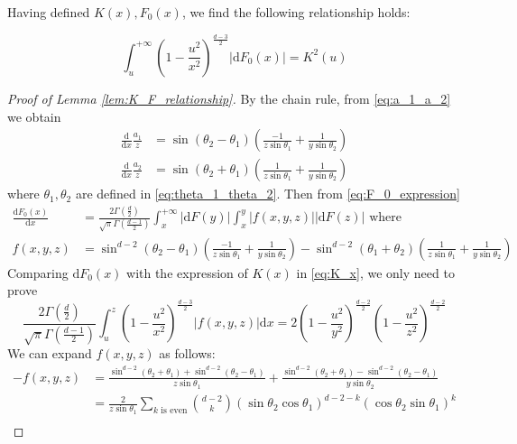 \documentclass{aptpub}
\def\d{\mathrm{d}}
\begin{document}
Having defined $K(x), F_0(x)$, we find the following relationship holds:
\begin{lemma}\label{lem:K_F_relationship}
\begin{equation}\label{eq:F_0_integration}
     \int_u^{+\infty}
     (1-\frac{u^2}{x^2})^{\frac{d-3}{2}} |\d F_0(x)| = K^2(u)
\end{equation}
\end{lemma}
\begin{proof}[Proof of Lemma \ref{lem:K_F_relationship}]
     By the chain rule, from \eqref{eq:a_1_a_2} we obtain
\begin{align*}
    \frac{\d}{\d x}\frac{a_1}{z} &
    = \sin(\theta_2 - \theta_1)
    \left(\frac{-1}{z\sin\theta_1}
    +\frac{1}{y\sin \theta_2}\right)\\
    \frac{\d}{\d x}\frac{a_2}{z} &
    = \sin(\theta_2 + \theta_1)
    \left(\frac{1}{z\sin\theta_1}
    +\frac{1}{y\sin \theta_2}\right)
\end{align*}
where $\theta_1, \theta_2$ are defined in \eqref{eq:theta_1_theta_2}.
Then from \eqref{eq:F_0_expression}
\begin{align*}
    \frac{\d F_0(x)}{\d x} & =\frac{2\Gamma(\frac{d}{2})}
    {\sqrt{\pi}\Gamma(\frac{d-1}{2})}
    \int_x^{+\infty} |\d F(y)| \int_x^y |f(x,y,z)| |\d F(z)| 
    \textrm{ where }\\
    f(x,y,z) & = \sin^{d-2} (\theta_2 - \theta_1)
    \left(\frac{-1}{z\sin\theta_1}
    +\frac{1}{y\sin \theta_2}\right)
    - \sin^{d-2}(\theta_1 + \theta_2)
    \left(\frac{1}{z\sin\theta_1}
    +\frac{1}{y\sin \theta_2}\right)
\end{align*}
Comparing $\d F_0(x)$
with the expression of $K(x)$ in
\eqref{eq:K_x},
we only need to prove
\begin{equation}\label{eq:ref_prove_integration}    
    \frac{2\Gamma(\frac{d}{2})}
    {\sqrt{\pi}\Gamma(\frac{d-1}{2})}
    \int_u^z (1-\frac{u^2}{x^2})^{\frac{d-3}{2}}
    |f(x,y,z)|\d x =
    2(1-\frac{u^2}{y^2})^{\frac{d-2}{2}}
    (1-\frac{u^2}{z^2})^{\frac{d-2}{2}}
\end{equation}
We can expand $f(x,y,z)$ as follows:
\begin{align*}
-f(x,y,z)&=\frac{\sin^{d-2}(\theta_2+\theta_1)
+ \sin^{d-2}(\theta_2 - \theta_1)}{z\sin\theta_1}
+\frac{\sin^{d-2}(\theta_2+\theta_1)
- \sin^{d-2}(\theta_2 - \theta_1)}{y\sin\theta_2} \\
&=\frac{2}{z\sin\theta_1}\sum_{k \textrm{ is even}}
\binom{d-2}{k} (\sin\theta_2\cos\theta_1)^{d-2-k}
(\cos\theta_2 \sin\theta_1)^k \\

\end{align*}
\end{proof}
\end{document}
